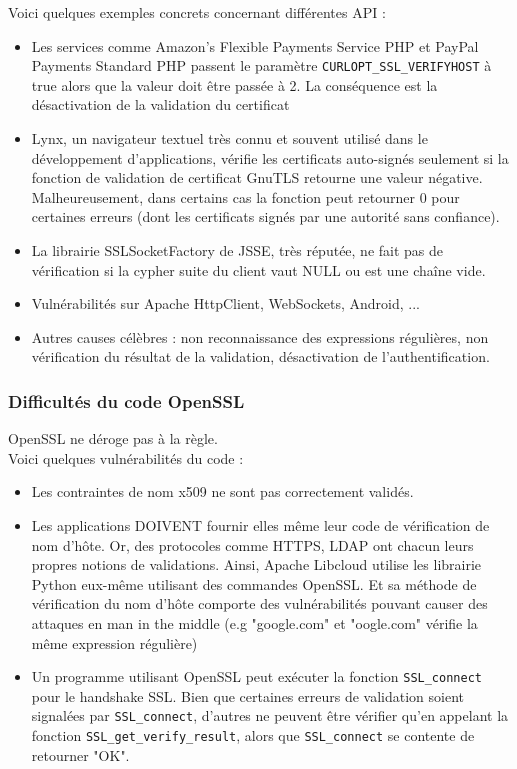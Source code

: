 			
			Voici quelques exemples concrets concernant différentes API : 
			\begin{itemize}
			\item Les services comme Amazon's Flexible Payments Service PHP et PayPal Payments Standard PHP passent le paramètre \texttt{CURLOPT\_SSL\_VERIFYHOST} à true alors que la valeur doit être passée à 2. La conséquence est la désactivation de la validation du certificat
			\item Lynx, un navigateur textuel très connu et souvent utilisé dans le développement d'applications, vérifie les certificats auto-signés seulement si la fonction de validation de certificat GnuTLS retourne une valeur négative. Malheureusement, dans certains cas la fonction peut retourner 0 pour certaines erreurs (dont les certificats signés par une autorité sans confiance).
			\item La librairie SSLSocketFactory de JSSE, très réputée, ne fait pas de vérification si la cypher suite du client vaut NULL ou est une chaîne vide.
			\item Vulnérabilités sur Apache HttpClient, WebSockets, Android, ...
			\item Autres causes célèbres : non reconnaissance des expressions régulières, non vérification du résultat de la validation, désactivation de l'authentification.\\
			\end{itemize}
			
					
		\subsubsection{Difficultés du code OpenSSL}
			

			OpenSSL ne déroge pas à la règle.\\
			Voici quelques vulnérabilités du code :
			\begin{itemize}
			\item Les contraintes de nom x509 ne sont pas correctement validés.
			\item Les applications DOIVENT fournir elles même leur code de vérification de nom d'hôte. Or, des protocoles comme HTTPS, LDAP ont chacun leurs propres notions de validations. Ainsi, Apache Libcloud utilise les librairie Python eux-même utilisant des commandes OpenSSL. Et sa méthode de vérification du nom d'hôte comporte des vulnérabilités pouvant causer des attaques en man in the middle (e.g "google.com" et "oogle.com" vérifie la même expression régulière)
			\item Un programme utilisant OpenSSL peut exécuter la fonction \texttt{SSL\_connect} pour le handshake SSL. Bien que certaines erreurs de validation soient signalées par \texttt{SSL\_connect}, d'autres ne peuvent être vérifier qu'en appelant la fonction \texttt{SSL\_get\_verify\_result}, alors que \texttt{SSL\_connect} se contente de retourner "OK".
			\end{itemize}

